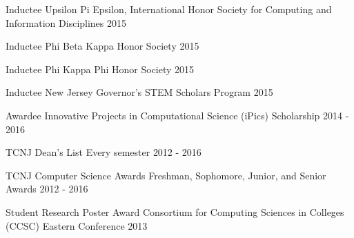 
\begin{cvhonors}

  \cvhonor
    {Inductee} %
    {Upsilon Pi Epsilon, International Honor Society for Computing and Information Disciplines} %
    {2015} %

  \cvhonor
    {Inductee} %
    {Phi Beta Kappa Honor Society} %
    {2015} %

  \cvhonor
    {Inductee} %
    {Phi Kappa Phi Honor Society} %
    {2015} %

  \cvhonor
    {Inductee} %
    {New Jersey Governor's STEM Scholars Program} %
    {2015} %

  \cvhonor
    {Awardee} %
    {Innovative Projects in Computational Science (iPics) Scholarship} %
    {2014 - 2016} %

  \cvhonor
    {TCNJ Dean's List} %
    {Every semester} %
    {2012 - 2016} %



  \cvhonor
    {TCNJ Computer Science Awards} %
    {Freshman, Sophomore, Junior, and Senior Awards} %
    {2012 - 2016} %

  \cvhonor
    {Student Research Poster Award} %
    {Consortium for Computing Sciences in Colleges (CCSC) Eastern Conference} %
    {2013} %

\end{cvhonors}
